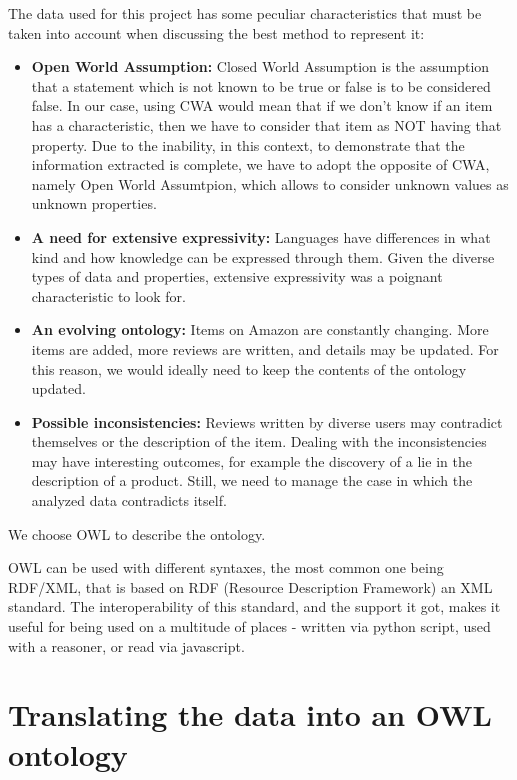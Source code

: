 \documentclass[LaM,oneside,binding=0.6cm]{sapthesis}
\begin{document}
The data used for this project has some peculiar characteristics that must be taken into account when discussing the best method to represent it:
\begin{itemize}
	\item \textbf{Open World Assumption: } Closed World Assumption is the assumption that a statement which is not known to be true or false is to be considered false. In our case, using CWA would mean that if we don't know if an item has a characteristic, then we have to consider that item as NOT having that property. Due to the inability, in this context, to demonstrate that the information extracted is complete, we have to adopt the opposite of CWA, namely Open World Assumtpion, which allows to consider unknown values as unknown properties.

	\item \textbf{A need for extensive expressivity: } Languages have differences in what kind and how knowledge can be expressed through them. Given the diverse types of data and properties, extensive expressivity was a poignant characteristic to look for.

	\item \textbf{An evolving ontology: } Items on Amazon are constantly changing. More items are added, more reviews are written, and details may be updated. For this reason, we would ideally need to keep the contents of the ontology updated.

	\item \textbf{Possible inconsistencies: } Reviews written by diverse users may contradict themselves or the description of the item. Dealing with the inconsistencies may have interesting outcomes, for example the discovery of a lie in the description of a product. Still, we need to manage the case in which the analyzed data contradicts itself.
\end{itemize}

We choose OWL to describe the ontology. 

OWL \parencite{dean_owl_2004} can be used with different syntaxes, the most common one being RDF/XML, that is based on RDF (Resource Description Framework) an XML standard. The interoperability of this standard, and the support it got, makes it useful for being used on a multitude of places - written via python script, used with a reasoner, or read via javascript. 

\section{Translating the data into an OWL ontology}
\end{document}
